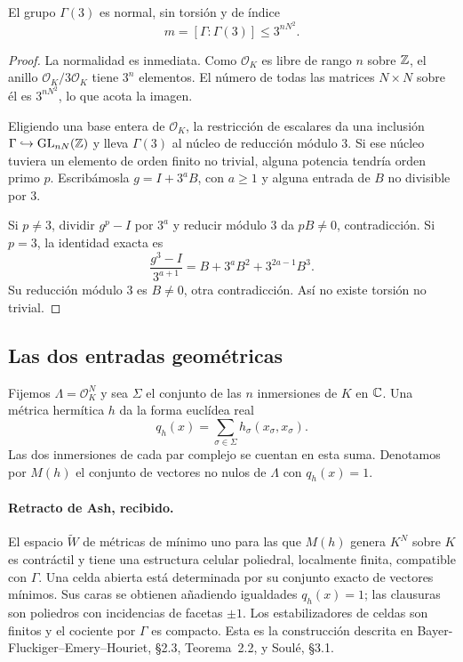 \begin{lema}
\label{lem:ti-nivel-tres}
El grupo $\Gamma(3)$ es normal, sin torsión y de índice
\begin{equation}
 m=[\Gamma:\Gamma(3)]\le3^{nN^2}.
 \label{eq:ti-indice}
\end{equation}
\end{lema}

\begin{proof}
La normalidad es inmediata. Como $\mathcal O_K$ es libre
de rango $n$ sobre $\mathbb{Z}$, el anillo $\mathcal O_K/3\mathcal O_K$
tiene $3^n$ elementos. El número de todas las matrices
$N\times N$ sobre él es $3^{nN^2}$, lo que acota la imagen.

Eligiendo una base entera de $\mathcal O_K$, la restricción
de escalares da una inclusión
$\Gamma\hookrightarrow\operatorname{GL}_{nN}(\mathbb{Z})$ y lleva
$\Gamma(3)$ al núcleo de reducción módulo $3$.
Si ese núcleo tuviera un elemento de orden finito no trivial,
alguna potencia tendría orden primo $p$. Escribámosla
$g=I+3^aB$, con $a\ge1$ y alguna entrada de $B$ no divisible
por $3$.

Si $p\ne3$, dividir $g^p-I$ por $3^a$ y reducir módulo $3$
da $pB\ne0$, contradicción. Si $p=3$, la identidad exacta es
\[
 \frac{g^3-I}{3^{a+1}}
   =B+3^aB^2+3^{2a-1}B^3.
\]
Su reducción módulo $3$ es $B\ne0$, otra contradicción.
Así no existe torsión no trivial.
\end{proof}

\subsection{Las dos entradas geométricas}

Fijemos $\Lambda=\mathcal O_K^N$ y sea $\Sigma$ el conjunto
de las $n$ inmersiones de $K$ en $\mathbb{C}$.
Una métrica hermítica $h$ da la forma euclídea real
\[
 q_h(x)=\sum_{\sigma\in\Sigma}h_\sigma(x_\sigma,x_\sigma).
\]
Las dos inmersiones de cada par complejo se cuentan en esta
suma. Denotamos por $M(h)$ el conjunto de vectores no nulos
de $\Lambda$ con $q_h(x)=1$.

\paragraph{Retracto de Ash, recibido.}
El espacio $\widetilde W$ de métricas de mínimo uno para las
que $M(h)$ genera $K^N$ sobre $K$ es contráctil y tiene
una estructura celular poliedral, localmente finita,
compatible con $\Gamma$. Una celda abierta está determinada
por su conjunto exacto de vectores mínimos. Sus caras se
obtienen añadiendo igualdades $q_h(x)=1$; las clausuras
son poliedros con incidencias de facetas $\pm1$.
Los estabilizadores de celdas son finitos y el cociente
por $\Gamma$ es compacto.
Esta es la construcción descrita en
Bayer-Fluckiger--Emery--Houriet, §2.3, Teorema~2.2,
y Soulé, §3.1.

